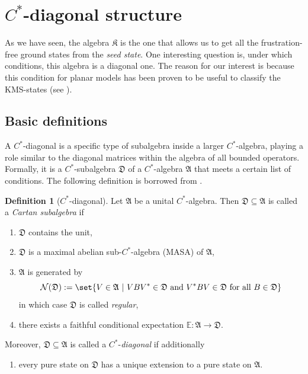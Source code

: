 \documentclass[a4paper,12pt,twoside,reqno]{amsart}
\theoremstyle{plain}
\theoremstyle{definition}
\newtheorem{definition}[teo]{Definition}
\theoremstyle{remark}
\numberwithin{equation}{section}
\numberwithin{figure}{section}
\numberwithin{table}{section}
\newcommand{\n}[1]{\mathbb{#1}}
\begin{document}
	
	
	\section{$C^*$-diagonal structure}\label{sec:diagonal}
	
	
	As we have seen, the algebra $\mathfrak{K}$ is the one that allows us to get all the frustration-free ground states from the \textit{seed state}. One interesting question is, under which conditions, this algebra is a diagonal one. The reason for our interest is because this condition for planar models has been proven to be useful to classify the KMS-states (see \cite{PoloOjitoProdan2026}).
	
	\subsection{Basic definitions}
	
	
	A \(C^{*}\)-diagonal is a specific type of subalgebra inside a larger \(C^{*}\)-algebra, playing a role similar to the diagonal matrices within the algebra of all bounded operators. Formally, it is a \(C^{*}\)-subalgebra \(\mathfrak{D}\) of a \(C^{*}\)-algebra \(\mathfrak{A}\) that meets a certain list of conditions. The following definition is borrowed from \cite[Definition 5.1]{Renault2008}.
	\begin{definition}[\(C^{*}\)-diagonal]\label{def:cartan}
		Let $\mathfrak{A}$ be a unital $C^*$-algebra. Then $\mathfrak{D}\subseteq \mathfrak{A}$ is called a \emph{Cartan subalgebra} if
		\begin{enumerate}
			\item[(a)] $\mathfrak{D}$ contains the unit,
			\item[(b)] $\mathfrak{D}$ is a maximal abelian sub-$C^*$-algebra (MASA) of $\mathfrak{A}$,
			\item[(c)] $\mathfrak{A}$ is generated by 
			\[
			\mathcal{N}(\mathfrak{D}):=\set{V\in\mathfrak{A} ~\lvert~ VBV^*\in\mathfrak{D} \text{ and } V^*BV\in\mathfrak{D} \text{ for all }B\in\mathfrak{D}}
			\]
			in which case $\mathfrak{D}$ is called \emph{regular},
			\item[(d)] there exists a faithful conditional expectation $\n{E}:\mathfrak{A}\to\mathfrak{D}$.
		\end{enumerate}
		Moreover, $\mathfrak{D}\subseteq \mathfrak{A}$ is called a $C^*$-\emph{diagonal} if additionally
		\begin{enumerate}
			\item[(e)] every pure state on $\mathfrak{D}$ has a unique extension to a pure state on $\mathfrak{A}$.
		\end{enumerate}
	\end{definition}
	
\end{document}
